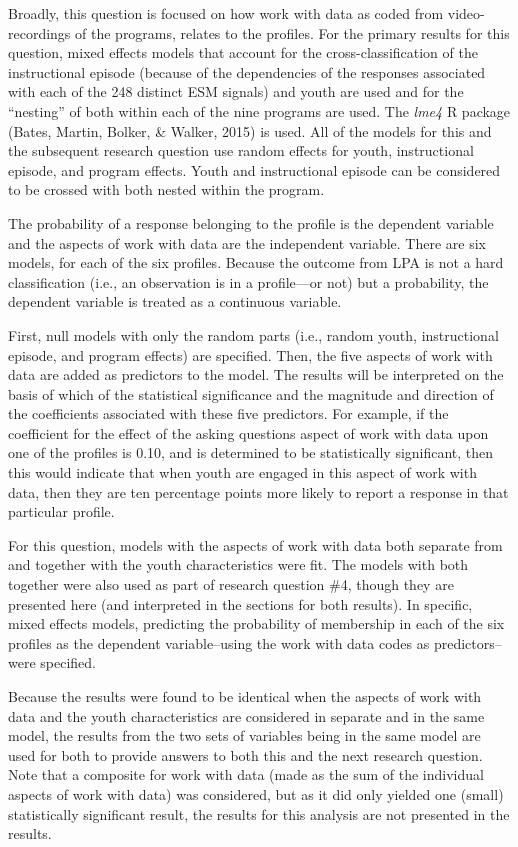 \documentclass[]{book}
\theoremstyle{definition}
\theoremstyle{definition}
\theoremstyle{definition}
\theoremstyle{remark}
\begin{document}
Broadly, this question is focused on how work with data as coded from
video-recordings of the programs, relates to the profiles. For the
primary results for this question, mixed effects models that account for
the cross-classification of the instructional episode (because of the
dependencies of the responses associated with each of the 248 distinct
ESM signals) and youth are used and for the ``nesting'' of both within
each of the nine programs are used. The \emph{lme4} R package (Bates,
Martin, Bolker, \& Walker, 2015) is used. All of the models for this and
the subsequent research question use random effects for youth,
instructional episode, and program effects. Youth and instructional
episode can be considered to be crossed with both nested within the
program.

The probability of a response belonging to the profile is the dependent
variable and the aspects of work with data are the independent variable.
There are six models, for each of the six profiles. Because the outcome
from LPA is not a hard classification (i.e., an observation is in a
profile---or not) but a probability, the dependent variable is treated
as a continuous variable.

First, null models with only the random parts (i.e., random youth,
instructional episode, and program effects) are specified. Then, the
five aspects of work with data are added as predictors to the model. The
results will be interpreted on the basis of which of the statistical
significance and the magnitude and direction of the coefficients
associated with these five predictors. For example, if the coefficient
for the effect of the asking questions aspect of work with data upon one
of the profiles is 0.10, and is determined to be statistically
significant, then this would indicate that when youth are engaged in
this aspect of work with data, then they are ten percentage points more
likely to report a response in that particular profile.

For this question, models with the aspects of work with data both
separate from and together with the youth characteristics were fit. The
models with both together were also used as part of research question
\#4, though they are presented here (and interpreted in the sections for
both results). In specific, mixed effects models, predicting the
probability of membership in each of the six profiles as the dependent
variable--using the work with data codes as predictors--were specified.

Because the results were found to be identical when the aspects of work
with data and the youth characteristics are considered in separate and
in the same model, the results from the two sets of variables being in
the same model are used for both to provide answers to both this and the
next research question. Note that a composite for work with data (made
as the sum of the individual aspects of work with data) was considered,
but as it did only yielded one (small) statistically significant result,
the results for this analysis are not presented in the results.
\end{document}
